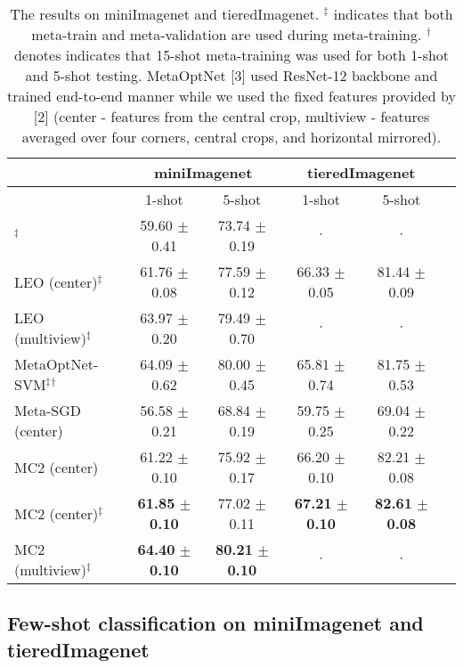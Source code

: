 \documentclass{article}
\begin{document}
\begin{table}[h]
\vskip -0.1in
\caption{The results on miniImagenet and tieredImagenet. $^\ddagger$ indicates that both meta-train and meta-validation are used during meta-training. $^\dagger$ denotes indicates that 15-shot meta-training was used for both 1-shot and 5-shot testing. MetaOptNet [3] used ResNet-12 backbone and trained end-to-end manner while we used the fixed features provided by [2] (center - features from the central crop, multiview - features averaged over four corners, central crops, and horizontal mirrored).}
\vskip -0.1in
\label{table:miniimagenet_wrn}
\begin{center}
\begin{small}
\begin{tabular}{lccccc}
\toprule
& \multicolumn{2}{c}{miniImagenet} & \multicolumn{2}{c}{tieredImagenet} \\
\midrule
& 1-shot & 5-shot & 1-shot & 5-shot \\
\midrule
\cite{Qiao-cvpr18}$^\ddagger$ & 59.60 $\pm$ 0.41 & 73.74 $\pm$ 0.19 & $\cdot$ & $\cdot$ \\
LEO (center)$^\ddagger$ \cite{rusu-iclr19} & 61.76 $\pm$ 0.08 & 77.59 $\pm$ 0.12 & 66.33 $\pm$ 0.05 & 81.44 $\pm$ 0.09 \\
LEO (multiview)$^\ddagger$ \cite{rusu-iclr19} & 63.97 $\pm$ 0.20 & 79.49 $\pm$ 0.70 & $\cdot$ & $\cdot$ \\
MetaOptNet-SVM$^\ddagger$$^\dagger$ \cite{metaopt} & 64.09 $\pm$ 0.62 & 80.00 $\pm$ 0.45 & 65.81 $\pm$ 0.74 & 81.75 $\pm$ 0.53 \\
\midrule
Meta-SGD (center)  & 56.58 $\pm$ 0.21 &  68.84 $\pm$ 0.19 & 59.75 $\pm$ 0.25 & 69.04 $\pm$ 0.22 \\
MC2 (center)       & 61.22 $\pm$ 0.10 &  75.92 $\pm$ 0.17 & 66.20 $\pm$ 0.10 & 82.21 $\pm$ 0.08 \\
MC2 (center)$^\ddagger$ & \textbf{61.85} $\pm$ \textbf{0.10} &  77.02 $\pm$ 0.11 & \textbf{67.21} $\pm$ \textbf{0.10} & \textbf{82.61} $\pm$ \textbf{0.08} \\
MC2 (multiview)$^\ddagger$ &  \textbf{64.40} $\pm$ \textbf{0.10}  & \textbf{80.21} $\pm$ \textbf{0.10} & $\cdot$ & $\cdot$ \\
\bottomrule
\end{tabular}
\end{small}
\end{center}
\vskip -0.1in
\end{table}




\subsection{Few-shot classification on miniImagenet and tieredImagenet}
\end{document}
